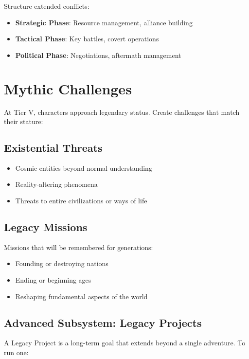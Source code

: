Structure extended conflicts:
\begin{itemize}
    \item \textbf{Strategic Phase}: Resource management, alliance building
    \item \textbf{Tactical Phase}: Key battles, covert operations
    \item \textbf{Political Phase}: Negotiations, aftermath management
\end{itemize}

\section{Mythic Challenges}

At Tier V, characters approach legendary status. Create challenges that match their stature:

\subsection*{Existential Threats}

\begin{itemize}
    \item Cosmic entities beyond normal understanding
    \item Reality-altering phenomena
    \item Threats to entire civilizations or ways of life
\end{itemize}

\subsection*{Legacy Missions}

Missions that will be remembered for generations:
\begin{itemize}
    \item Founding or destroying nations
    \item Ending or beginning ages
    \item Reshaping fundamental aspects of the world
\end{itemize}

\subsection*{Advanced Subsystem: Legacy Projects}

A Legacy Project is a long-term goal that extends beyond a single adventure. To run one:

